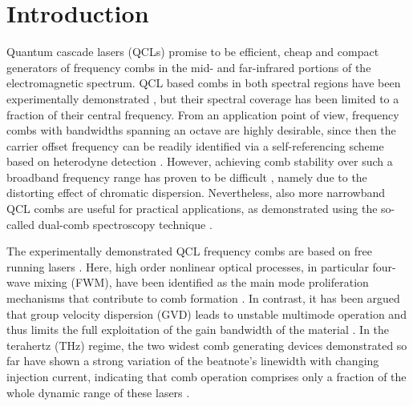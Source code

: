 \documentclass[10pt]{article}
\begin{document}
	\section{Introduction}
	\label{sec:intro}
	Quantum cascade lasers (QCLs) promise to be efficient, cheap and compact
	generators of frequency combs in the mid- and far-infrared portions of the
	electromagnetic spectrum. QCL based combs in both spectral regions have been
	experimentally demonstrated
	\cite{hugi2012mid,burghoff2014terahertz,wienold2014evidence,lu2015high,cappelli2015intrinsic}%
	, but their spectral coverage has been limited to a fraction of their central
	frequency. From an application point of view, frequency combs with bandwidths
	spanning an octave are highly desirable, since then the carrier offset
	frequency can be readily identified via a self-referencing scheme based on
	heterodyne detection \cite{ye2005femtosecond}. However, achieving comb
	stability over such a broadband frequency range has proven to be difficult
	\cite{rosch2015octave}, namely due to the distorting effect of chromatic
	dispersion. Nevertheless, also more narrowband QCL combs are useful for
	practical applications, as demonstrated using the so-called dual-comb
	spectroscopy technique \cite{villares2014dual,yang2016terahertz}.
	
	The experimentally demonstrated QCL frequency combs are based on free
	running lasers
	\cite{hugi2012mid,burghoff2014terahertz,wienold2014evidence,rosch2015octave}.
	Here, high order nonlinear optical processes, in particular four-wave mixing
	(FWM), have been identified as the main mode proliferation mechanisms that
	contribute to comb formation \cite{friedli2013four,khurgin2014coherent}. In contrast, it has been argued
	that group velocity dispersion (GVD) leads to unstable multimode operation and
	thus limits the full exploitation of the gain bandwidth of the material
	\cite{villares2015quantum}. In the terahertz (THz) regime, the two widest comb
	generating devices demonstrated so far have shown a strong variation of the
	beatnote's linewidth with changing injection current, indicating that comb
	operation comprises only a fraction of the whole dynamic range of these lasers
	\cite{burghoff2014terahertz,rosch2015octave}.
	
\end{document}

